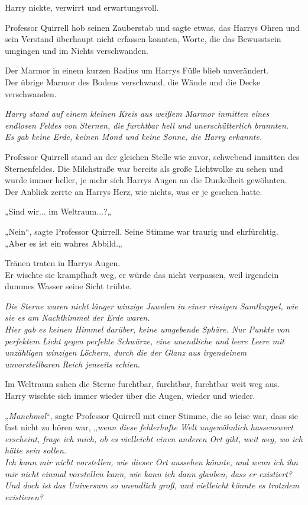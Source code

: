 {Harry nickte, verwirrt und erwartungsvoll.

Professor Quirrell hob seinen Zauberstab und sagte etwas, das Harrys Ohren und sein Verstand überhaupt nicht erfassen konnten, Worte, die das Bewusstsein umgingen und im Nichts verschwanden.

Der Marmor in einem kurzen Radius um Harrys Füße blieb unverändert.\\ Der übrige Marmor des Bodens verschwand, die Wände und die Decke verschwanden.

\emph{Harry stand auf einem kleinen Kreis aus weißem Marmor inmitten eines endlosen Feldes von Sternen, die furchtbar hell und unerschütterlich brannten.\\ Es gab keine Erde, keinen Mond und keine Sonne, die Harry erkannte.}

Professor Quirrell stand an der gleichen Stelle wie zuvor, schwebend inmitten des Sternenfeldes. Die Milchstraße war bereits als große Lichtwolke zu sehen und wurde immer heller, je mehr sich Harrys Augen an die Dunkelheit gewöhnten.\\ Der Anblick zerrte an Harrys Herz, wie nichts, was er je gesehen hatte.

„Sind wir... im Weltraum...?„

„Nein“, sagte Professor Quirrell. Seine Stimme war traurig und ehrfürchtig. „Aber es ist ein wahres Abbild.„

Tränen traten in Harrys Augen.\\ Er wischte sie krampfhaft weg, er würde das nicht verpassen, weil irgendein dummes Wasser seine Sicht trübte.

\emph{Die Sterne waren nicht länger winzige Juwelen in einer riesigen Samtkuppel, wie sie es am Nachthimmel der Erde waren.\\ Hier gab es keinen Himmel darüber, keine umgebende Sphäre. Nur Punkte von perfektem Licht gegen perfekte Schwärze, eine unendliche und leere Leere mit unzähligen winzigen Löchern, durch die der Glanz aus irgendeinem unvorstellbaren Reich jenseits schien.}

Im Weltraum sahen die Sterne furchtbar, furchtbar, furchtbar weit weg aus. Harry wischte sich immer wieder über die Augen, wieder und wieder.

„\emph{Manchmal}“, sagte Professor Quirrell mit einer Stimme, die so leise war, dass sie fast nicht zu hören war, „\emph{wenn diese fehlerhafte Welt ungewöhnlich hassenswert erscheint, frage ich mich, ob es vielleicht einen anderen Ort gibt, weit weg, wo ich} \emph{hätte sein sollen.\\ Ich kann mir nicht vorstellen, wie dieser Ort aussehen könnte, und wenn ich ihn mir nicht einmal vorstellen kann, wie kann ich dann glauben, dass er existiert? Und doch ist das Universum so unendlich groß, und vielleicht könnte es trotzdem existieren?}

}
